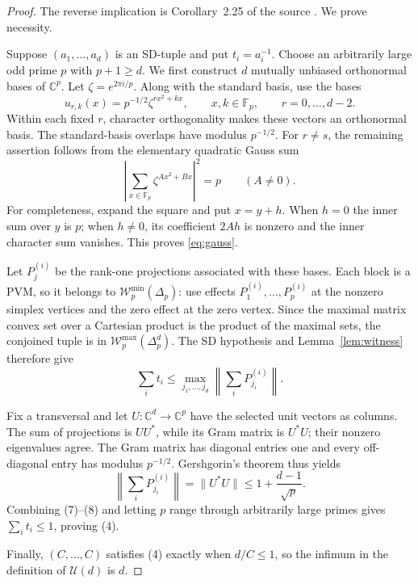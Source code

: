 \documentclass[11pt]{article}
\newcommand{\W}{\mathcal W}
\newcommand{\C}{\mathbb C}
\newcommand{\F}{\mathbb F}
\begin{document}
\begin{proof}
The reverse implication is Corollary~2.25 of the source \cite{Passer}.  We
prove necessity.

Suppose $(a_1,\ldots,a_d)$ is an SD-tuple and put $t_i=a_i^{-1}$.  Choose an
arbitrarily large odd prime $p$ with $p+1\geq d$.  We first construct $d$
mutually unbiased orthonormal bases of $\C^p$.  Let
$\zeta=e^{2\pi i/p}$.  Along with the standard basis, use the bases
\begin{equation}\label{eq:mub}
 u_{r,k}(x)=p^{-1/2}\zeta^{rx^2+kx},
 \qquad x,k\in\F_p,\qquad r=0,\ldots,d-2.
\end{equation}
Within each fixed $r$, character orthogonality makes these vectors an
orthonormal basis.  The standard-basis overlaps have modulus $p^{-1/2}$.
For $r\ne s$, the remaining assertion follows from the elementary quadratic
Gauss sum
\begin{equation}\label{eq:gauss}
 \left|\sum_{x\in\F_p}\zeta^{Ax^2+Bx}\right|^2=p
 \qquad(A\ne0).
\end{equation}
For completeness, expand the square and put $x=y+h$.  When $h=0$ the inner
sum over $y$ is $p$; when $h\ne0$, its coefficient $2Ah$ is nonzero and the
inner character sum vanishes.  This proves \eqref{eq:gauss}.

Let $P^{(i)}_j$ be the rank-one projections associated with these bases.
Each block is a PVM, so it belongs to $\W^{\min}_p(\Delta_p)$: use effects
$P^{(i)}_1,\ldots,P^{(i)}_p$ at the nonzero simplex vertices and the zero
effect at the zero vertex.  Since the maximal matrix convex set over a
Cartesian product is the product of the maximal sets, the conjoined tuple is
in $\W^{\max}_p(\Delta_p^d)$.  The SD hypothesis and
Lemma~\ref{lem:witness} therefore give
\begin{equation}
 \sum_i t_i\leq
 \max_{j_1,\ldots,j_d}\left\|\sum_iP^{(i)}_{j_i}\right\|.
\end{equation}

Fix a transversal and let $U:\C^d\to\C^p$ have the selected unit vectors as
columns.  The sum of projections is $UU^*$, while its Gram matrix is $U^*U$;
their nonzero eigenvalues agree.  The Gram matrix has diagonal entries one
and every off-diagonal entry has modulus $p^{-1/2}$.  Gershgorin's theorem
thus yields
\begin{equation}
 \left\|\sum_iP^{(i)}_{j_i}\right\|
 =\|U^*U\|\leq1+\frac{d-1}{\sqrt p}.
\end{equation}
Combining (7)--(8) and letting $p$ range through arbitrarily large primes
gives $\sum_i t_i\leq1$, proving (4).

Finally, $(C,\ldots,C)$ satisfies (4) exactly when $d/C\leq1$, so the
infimum in the definition of $\mathcal U(d)$ is $d$.
\end{proof}
\end{document}
